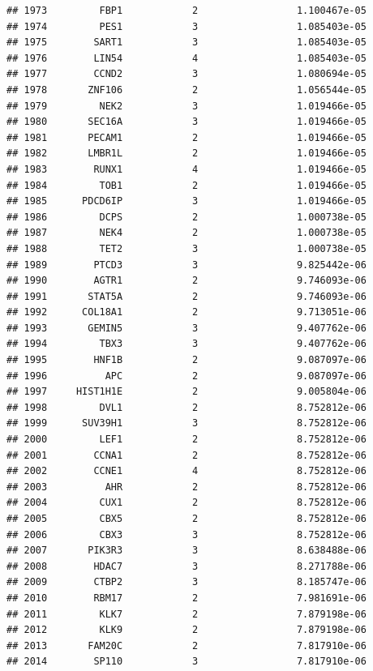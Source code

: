 \documentclass[
]{article}
\begin{document}
\begin{verbatim}
## 1973         FBP1            2                 1.100467e-05
## 1974         PES1            3                 1.085403e-05
## 1975        SART1            3                 1.085403e-05
## 1976        LIN54            4                 1.085403e-05
## 1977        CCND2            3                 1.080694e-05
## 1978       ZNF106            2                 1.056544e-05
## 1979         NEK2            3                 1.019466e-05
## 1980       SEC16A            3                 1.019466e-05
## 1981       PECAM1            2                 1.019466e-05
## 1982       LMBR1L            2                 1.019466e-05
## 1983        RUNX1            4                 1.019466e-05
## 1984         TOB1            2                 1.019466e-05
## 1985      PDCD6IP            3                 1.019466e-05
## 1986         DCPS            2                 1.000738e-05
## 1987         NEK4            2                 1.000738e-05
## 1988         TET2            3                 1.000738e-05
## 1989        PTCD3            3                 9.825442e-06
## 1990        AGTR1            2                 9.746093e-06
## 1991       STAT5A            2                 9.746093e-06
## 1992      COL18A1            2                 9.713051e-06
## 1993       GEMIN5            3                 9.407762e-06
## 1994         TBX3            3                 9.407762e-06
## 1995        HNF1B            2                 9.087097e-06
## 1996          APC            2                 9.087097e-06
## 1997     HIST1H1E            2                 9.005804e-06
## 1998         DVL1            2                 8.752812e-06
## 1999      SUV39H1            3                 8.752812e-06
## 2000         LEF1            2                 8.752812e-06
## 2001        CCNA1            2                 8.752812e-06
## 2002        CCNE1            4                 8.752812e-06
## 2003          AHR            2                 8.752812e-06
## 2004         CUX1            2                 8.752812e-06
## 2005         CBX5            2                 8.752812e-06
## 2006         CBX3            3                 8.752812e-06
## 2007       PIK3R3            3                 8.638488e-06
## 2008        HDAC7            3                 8.271788e-06
## 2009        CTBP2            3                 8.185747e-06
## 2010        RBM17            2                 7.981691e-06
## 2011         KLK7            2                 7.879198e-06
## 2012         KLK9            2                 7.879198e-06
## 2013       FAM20C            2                 7.817910e-06
## 2014        SP110            3                 7.817910e-06

\end{verbatim}
\end{document}

